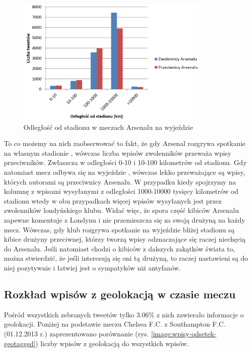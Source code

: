 \begin{figure}[ht!]
\centering
\includegraphics[width=95mm]{img//odleglosc-od-stadionu-away.png}
\caption{Odległość od stadionu w meczach Arsenalu na wyjeździe}
\label{image:odleglosc-od-stadionu-gosc}
\end{figure}

To co możemy na nich zaobserwować to fakt, że gdy Arsenal rozgrywa spotkanie na
własnym stadionie , wówczas liczba
wpisów zwolenników przeważa wpisy przeciwników.
Zwłaszcza w odległości 0-10 i 10-100 kilometrów od stadionu.
Gdy natomiast mecz odbywa się na wyjeździe
, wówczas lekko przeważające są wpisy,
których autorami są przeciwnicy Arsenalu.
W przypadku kiedy spojrzymy na kolumnę z wpisami wysyłanymi z odległości
1000-10000 tysięcy kilometrów od stadionu wtedy w obu przypadkach więcej wpisów
wysyłanych jest przez zwolenników londyńskiego klubu.
Widać więc, że spora część kibiców Arsenalu zapewne komentuje z Londynu
i nie przemieszcza się za swoją drużyną na każdy mecz. Wówczas, gdy klub rozgrywa
spotkanie na wyjeździe bliżej stadionu są kibice drużyny przeciwnej,
którzy tworzą wpisy odznaczające się raczej niechęcią do Arsenalu. 
Jeśli natomiast
chodzi o kibiców z dalszych zakątków świata to, można stwierdzić, że
jeśli interesują się oni tą drużyną, to raczej nastawieni są do niej pozytywnie
i łatwiej jest o sympatyków niż antyfanów.


\subsection{Rozkład wpisów z geolokacją w czasie meczu}
\label{subsection:geowpisy}
Pośród wszystkich zebranych tweetów tylko 3.06\% z nich zawierało informacje o
geolokacji. Poniżej na podstawie meczu Chelsea F.C. z Southampton F.C.
(01.12.2013 r.) zaprezentowano porównanie
(rys. \ref{image:wpisy-odsetek-geotagged}) liczby wpisów z geolokacją do
wszystkich wpisów.

